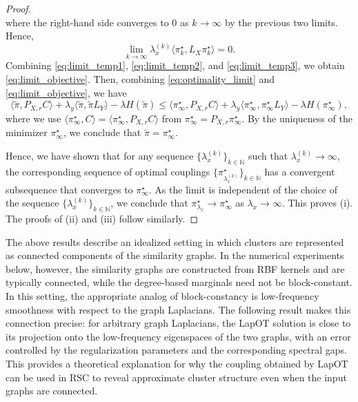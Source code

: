 \documentclass{article}
\theoremstyle{definition}
\begin{document}
\begin{proof}
\begin{equation*}
    \end{equation*}
    where the right-hand side converges to $0$ as $k \to \infty$ by the previous two limits. Hence, 
    \begin{equation}
        \label{eq:limit_temp3}
        \lim_{k \to \infty} \lambda_x^{(k)} \langle \pi^\star_k, L_X \pi^\star_k \rangle = 0.
    \end{equation}
    Combining \eqref{eq:limit_temp1}, \eqref{eq:limit_temp2}, and \eqref{eq:limit_temp3}, we obtain \eqref{eq:limit_objective}. Then, combining \eqref{eq:optimality_limit} and \eqref{eq:limit_objective}, we have
    \begin{equation*}
        \langle \tilde{\pi}, P_{X, r} C \rangle + \lambda_y \langle \tilde{\pi}, \tilde{\pi} L_Y \rangle - \lambda H(\tilde{\pi}) \le \langle \pi^\star_\infty, P_{X, r} C \rangle + \lambda_y \langle \pi^\star_\infty, \pi^\star_\infty L_Y \rangle - \lambda H(\pi^\star_\infty),
    \end{equation*}
    where we use $\langle \pi^\star_\infty, C \rangle = \langle \pi^\star_\infty, P_{X, r} C \rangle$ from $\pi^\star_\infty = P_{X, r} \pi^\star_\infty$. By the uniqueness of the minimizer $\pi^\star_\infty$, we conclude that $\tilde{\pi} = \pi^\star_\infty$.

    Hence, we have shown that for any sequence $\{\lambda_x^{(k)}\}_{k \in \mathbb{N}}$ such that $\lambda_x^{(k)} \to \infty$, the corresponding sequence of optimal couplings $\{\pi^\star_{\lambda_x^{(k)}}\}_{k \in \mathbb{N}}$ has a convergent subsequence that converges to $\pi^\star_\infty$. As the limit is independent of the choice of the sequence $\{\lambda_x^{(k)}\}_{k \in \mathbb{N}}$, we conclude that $\pi^\star_{\lambda_x} \to \pi^\star_\infty$ as $\lambda_x \to \infty$. This proves (i). The proofs of (ii) and (iii) follow similarly.
\end{proof}

The above results describe an idealized setting in which clusters are represented as connected components of the similarity graphs. In the numerical experiments below, however, the similarity graphs are constructed from RBF kernels and are typically connected, while the degree-based marginals need not be block-constant. In this setting, the appropriate analog of block-constancy is low-frequency smoothness with respect to the graph Laplacians. The following result makes this connection precise: for arbitrary graph Laplacians, the LapOT solution is close to its projection onto the low-frequency eigenspaces of the two graphs, with an error controlled by the regularization parameters and the corresponding spectral gaps. This provides a theoretical explanation for why the coupling obtained by LapOT can be used in RSC to reveal approximate cluster structure even when the input graphs are
connected.
\end{document}
